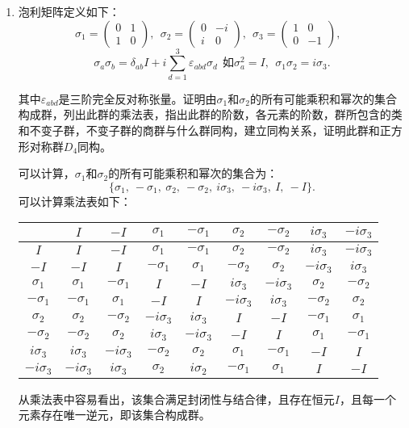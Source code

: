 \documentclass[reqno,a4paper,12pt]{amsart}
\begin{document}
\begin{enumerate}[1.]
\item 泡利矩阵定义如下：
\[
	\sigma_1 = \left( \begin{matrix}
		0 & 1 \\
		1 & 0
	\end{matrix} \right), \ \
	\sigma_2 = \left( \begin{matrix}
		0 & -i \\
		i & 0
	\end{matrix} \right), \ \
	\sigma_3 = \left( \begin{matrix}
		1 & 0 \\
		0 & -1
	\end{matrix} \right), \ \ \
\]
\[
	\sigma_a\sigma_b = \delta_{ab}I + i\sum_{d=1}^3 \varepsilon_{abd} \sigma_d \ \ \text{如}\sigma_a^2 = I, \ \ \sigma_1\sigma_2 = i\sigma_3.
\]

其中$\varepsilon_{abd}$是三阶完全反对称张量。证明由$\sigma_1$和$\sigma_2$的所有可能乘积和幂次的集合构成群，列出此群的乘法表，指出此群的阶数，各元素的阶数，群所包含的类和不变子群，不变子群的商群与什么群同构，建立同构关系，证明此群和正方形对称群$D_4$同构。
\begin{tcolorbox}[breakable, colback = black!5!white, colframe = black]
可以计算，$\sigma_1$和$\sigma_2$的所有可能乘积和幂次的集合为：
\[
	\{ \sigma_1, \ -\sigma_1, \ \sigma_2, \ -\sigma_2, \ i\sigma_3, \ -i \sigma_3, \ I, \ -I \}.
\]
可以计算乘法表如下：
\begin{table}[H]
\centering
\begin{tabular}{|c|c|c|c|c|c|c|c|c|}
	\hline
	{} & $I$ & $-I$ & $\sigma_1$ & $-\sigma_1$ & $\sigma_2$ & $-\sigma_2$ & $i\sigma_3$ & $-i\sigma_3$ \\ \hline
	$I$ & $I$ & $-I$ & $\sigma_1$ & $-\sigma_1$ & $\sigma_2$ & $-\sigma_2$ & $i\sigma_3$ & $-i\sigma_3$ \\ \hline
	$-I$ & $-I$ & $I$ & $-\sigma_1$ & $\sigma_1$ & $-\sigma_2$ & $\sigma_2$ & $-i\sigma_3$ & $i\sigma_3$ \\ \hline
	$\sigma_1$ & $\sigma_1$ & $-\sigma_1$ & $I$ & $-I$ & $i\sigma_3$ & $-i\sigma_3$ & $\sigma_2$ & $-\sigma_2$ \\ \hline
	$-\sigma_1$ & $-\sigma_1$ & $\sigma_1$ & $-I$ & $I$ & $-i\sigma_3$ & $i\sigma_3$ & $-\sigma_2$ & $\sigma_2$ \\ \hline
	$\sigma_2$ & $\sigma_2$ & $-\sigma_2$ & $-i\sigma_3$ & $i\sigma_3$ & $I$ & $-I$ & $-\sigma_1$ & $\sigma_1$ \\ \hline
	$-\sigma_2$ & $-\sigma_2$ & $\sigma_2$ & $i\sigma_3$ & $-i\sigma_3$ & $-I$ & $I$ & $\sigma_1$ & $-\sigma_1$ \\ \hline
	$i\sigma_3$ & $i\sigma_3$ & $-i\sigma_3$ & $-\sigma_2$ & $\sigma_2$ & $\sigma_1$ & $-\sigma_1$ & $-I$ & $I$ \\ \hline
	$-i\sigma_3$ & $-i\sigma_3$ & $i\sigma_3$ & $\sigma_2$ & $i\sigma_2$ & $-\sigma_1$ & $\sigma_1$ & $I$ & $-I$ \\ \hline
\end{tabular}
\end{table}
从乘法表中容易看出，该集合满足封闭性与结合律，且存在恒元$I$，且每一个元素存在唯一逆元，即该集合构成群。


\end{tcolorbox}
\end{enumerate}
\end{document}
